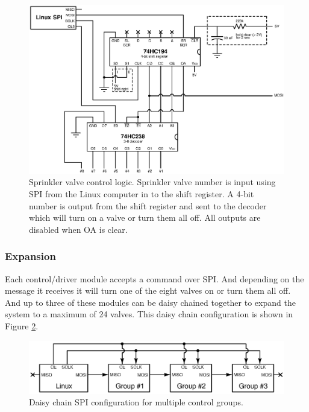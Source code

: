 \documentclass{article}
\begin{document}
\begin{figure}[hbp]
\includegraphics[scale=0.85]{xcircuit/control}
\caption{Sprinkler valve control logic.
Sprinkler valve number is input using SPI from the Linux computer in
to the shift register.
A 4-bit number is output from the shift register and sent to the
decoder which will turn on a valve or turn them all off.
All outputs are disabled when OA is clear.}\label{fig:control}
\end{figure}


\clearpage
\subsubsection{Expansion}
\label{sec:expansion}

Each control/driver module accepts a command over SPI.
And depending on the message it receives it will turn one of the
eight valves on or turn them all off.
And up to three of these modules can be daisy chained together
to expand the system to a maximum of 24 valves.
This daisy chain configuration is shown in Figure \ref{fig:expansion_spi}.

\begin{figure}[hbp]
\centering
\includegraphics[angle=0,scale=0.80]{xcircuit/expansion_spi}
\caption{Daisy chain SPI configuration for multiple control groups.
}\label{fig:expansion_spi}
\end{figure}
\end{document}
